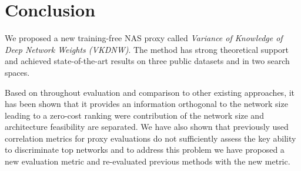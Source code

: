 \vspace{-0.5em}
\section{Conclusion}
\label{sec:conclusion}

We proposed a new training-free NAS proxy called \textit{Variance of Knowledge of Deep Network Weights (VKDNW)}. The method has strong theoretical support and achieved state-of-the-art results on three public datasets and in two search spaces. 

Based on throughout evaluation and comparison to other existing approaches, it has been shown that it provides an information orthogonal to the network size leading to a zero-cost ranking were contribution of the network size and architecture feasibility are separated. We have also shown that previously used correlation metrics for proxy evaluations do not sufficiently assess the key ability to discriminate top networks and to address this problem we have proposed a new evaluation metric and re-evaluated previous methods with the new metric. 